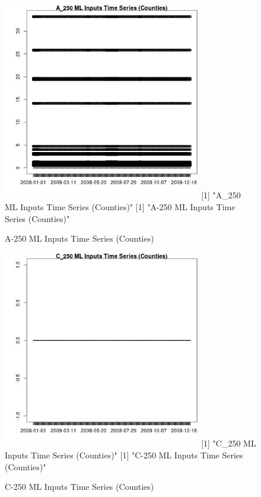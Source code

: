 \begin{figure} 
\centering  
\includegraphics[width=0.77\textwidth]{Code_Outputs/ML_input_report_ML_input_CountyGeometricCentroids_Locations_Dates_part_c_2008-01-01to2008-12-31_A_250TS.jpg} 
[1] "A_250 ML Inputs Time Series (Counties)"
[1] "A-250 ML Inputs Time Series (Counties)"
\caption{\label{fig:ML_input_report_ML_input_CountyGeometricCentroids_Locations_Dates_part_c_2008-01-01to2008-12-31A_250TS}A-250 ML Inputs Time Series (Counties)} 
\end{figure} 
 

\begin{figure} 
\centering  
\includegraphics[width=0.77\textwidth]{Code_Outputs/ML_input_report_ML_input_CountyGeometricCentroids_Locations_Dates_part_c_2008-01-01to2008-12-31_C_250TS.jpg} 
[1] "C_250 ML Inputs Time Series (Counties)"
[1] "C-250 ML Inputs Time Series (Counties)"
\caption{\label{fig:ML_input_report_ML_input_CountyGeometricCentroids_Locations_Dates_part_c_2008-01-01to2008-12-31C_250TS}C-250 ML Inputs Time Series (Counties)} 
\end{figure} 
 

